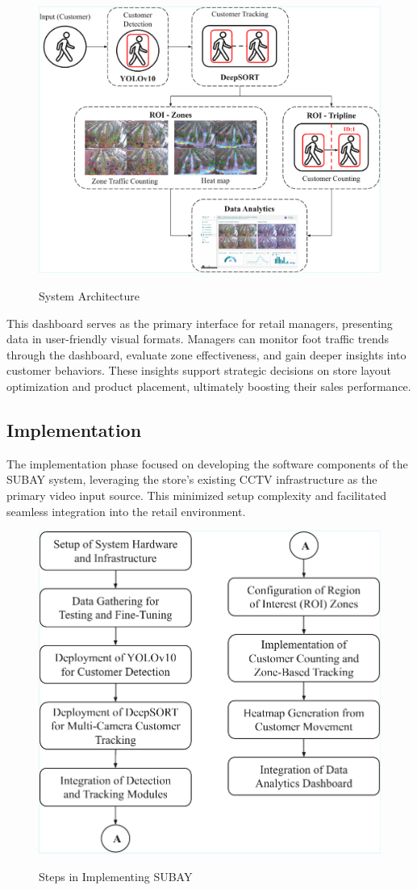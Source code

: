 {\begin{figure}[H]
\	\caption[System Architecture]{\newline \newline System Architecture}
	\centering
	\includegraphics[width=1\linewidth]{fig/3.13.pdf}
	\label{fig:3.13}
\end{figure}

This dashboard serves as the primary interface for retail managers, presenting data in user-friendly visual formats. Managers can monitor foot traffic trends through the dashboard, evaluate zone effectiveness, and gain deeper insights into customer behaviors. These insights support strategic decisions on store layout optimization and product placement, ultimately boosting their sales performance.

\subsection{Implementation}

The implementation phase focused on developing the software components of the SUBAY system, leveraging the store’s existing CCTV infrastructure as the primary video input source. This minimized setup complexity and facilitated seamless integration into the retail environment.

\begin{figure}[H]
	\caption[Steps in Implementing SUBAY]{\newline \newline Steps in Implementing SUBAY}
	\centering
	\includegraphics[width=0.50\linewidth]{fig/3.14.pdf}
	\label{fig:3.14}
\end{figure}

}
